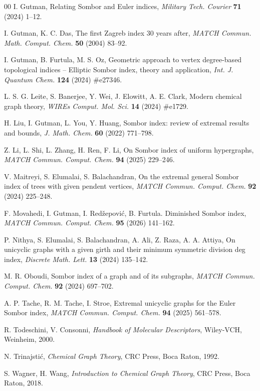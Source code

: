 \documentclass[12pt,a4paper]{article}
\begin{document}
\begin{thebibliography}{00}
I. Gutman, Relating Sombor and Euler indices,
        {\it Military Tech. Courier\/} {\bf 71} (2024) 1--12.

I. Gutman, K. C. Das, The first Zagreb index 30 years after, {\it MATCH Commun. Math. Comput. Chem.\/} {\bf 50} (2004) 83--92.

 I. Gutman, B. Furtula, M. S. Oz, Geometric approach to vertex
        degree-based topological indices -- Elliptic Sombor index, theory and application,
        {\it Int. J. Quantum Chem.\/} {\bf 124} (2024) \#e27346.


 L. S. G. Leite, S. Banerjee, Y. Wei, J. Elowitt, A. E. Clark, Modern chemical graph theory, {\it WIREs Comput. Mol. Sci.} {\bf14} (2024) \#e1729.


 H. Liu, I. Gutman, L. You, Y. Huang, Sombor index: review of extremal results and bounds, {\it J. Math. Chem.\/} {\bf 60} (2022) 771--798.


 Z. Li, L. Shi, L. Zhang, H. Ren, F. Li,
         On Sombor index of uniform hypergraphs, {\it MATCH Commun. Comput. Chem.\/}
         {\bf 94} (2025) 229--246.

 V. Maitreyi, S. Elumalai, S. Balachandran, On the
        extremal general Sombor index of trees with given pendent
        vertices, {\it MATCH Commun. Comput. Chem.\/} {\bf 92} (2024) 225--248.



 F. Movahedi, I. Gutman, I. Red\v{z}epovi\'c, B. Furtula.
        Diminished Sombor index, {\it MATCH Commun. Comput. Chem.\/} {\bf 95}
        (2026) 141--162.

 P. Nithya, S. Elumalai, S. Balachandran, A. Ali, Z. Raza, A. A. Attiya, On unicyclic graphs with a given girth and their minimum symmetric division deg index, \textit{Discrete Math. Lett.} \textbf{13} (2024) 135--142.

 M. R. Oboudi, Sombor index of a graph and of its
        subgraphs, {\it MATCH Commun. Comput. Chem.\/} {\bf 92} (2024) 697--702.



 A. P. Tache, R. M. Tache, I. Stroe, Extremal unicyclic
        graphs for the Euler Sombor index, {\it MATCH Commun. Comput. Chem.\/}
        {\bf 94} (2025) 561--578.

 R. Todeschini, V. Consonni, {\it Handbook of Molecular Descriptors}, Wiley-VCH, Weinheim, 2000.

 N. Trinajsti\'c, {\it Chemical Graph Theory},  CRC Press, Boca Raton, 1992.



 S. Wagner, H. Wang, {\it Introduction to Chemical Graph Theory},
        CRC Press, Boca Raton, 2018.



\end{thebibliography}
\end{document}
